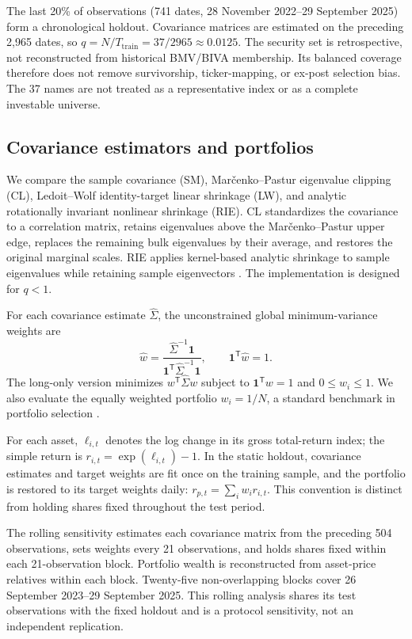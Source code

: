 \documentclass[11pt]{article}
\begin{document}
The last 20\% of observations (741 dates, 28 November 2022--29 September
2025) form a chronological holdout. Covariance matrices are estimated on the
preceding 2,965 dates, so $q=N/T_{\mathrm{train}}=37/2965\approx0.0125$.
The security set is retrospective, not reconstructed from historical
BMV/BIVA membership. Its balanced coverage therefore does not remove
survivorship, ticker-mapping, or ex-post selection bias. The 37 names are
not treated as a representative index or as a complete investable universe.

\subsection{Covariance estimators and portfolios}

We compare the sample covariance (SM), Mar\v cenko--Pastur eigenvalue
clipping (CL), Ledoit--Wolf identity-target linear shrinkage (LW), and
analytic rotationally invariant nonlinear shrinkage (RIE). CL standardizes
the covariance to a correlation matrix, retains eigenvalues above the
Mar\v cenko--Pastur upper edge, replaces the remaining bulk eigenvalues by
their average, and restores the original marginal scales. RIE applies
kernel-based analytic shrinkage to sample eigenvalues while retaining sample
eigenvectors \cite{laloux1999,ledoitwolf2004,ledoit2022}. The implementation
is designed for $q<1$.

For each covariance estimate $\widehat\Sigma$, the unconstrained
global minimum-variance weights are
\[
  \widehat w =
  \frac{\widehat\Sigma^{-1}\mathbf{1}}
       {\mathbf{1}^{\mathsf T}\widehat\Sigma^{-1}\mathbf{1}},
  \qquad \mathbf{1}^{\mathsf T}\widehat w=1.
\]
The long-only version minimizes $w^{\mathsf T}\widehat\Sigma w$ subject to
$\mathbf{1}^{\mathsf T}w=1$ and $0\leq w_i\leq1$. We also evaluate the
equally weighted portfolio $w_i=1/N$, a standard benchmark in portfolio
selection \cite{demiguel2009}.

For each asset, $\ell_{i,t}$ denotes the log change in its gross total-return
index; the simple return is $r_{i,t}=\exp(\ell_{i,t})-1$. In the static
holdout, covariance estimates and target weights are fit once on the
training sample, and the portfolio is restored to its target weights daily:
$r_{p,t}=\sum_iw_i r_{i,t}$. This convention is distinct from holding shares
fixed throughout the test period.

The rolling sensitivity estimates each covariance matrix from the preceding
504 observations, sets weights every 21 observations, and holds shares fixed
within each 21-observation block. Portfolio wealth is reconstructed from
asset-price relatives within each block. Twenty-five non-overlapping blocks
cover 26 September 2023--29 September 2025. This rolling analysis shares its
test observations with the fixed holdout and is a protocol sensitivity, not
an independent replication.
\end{document}
